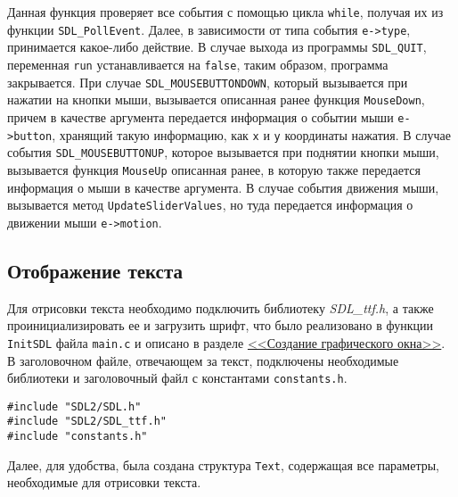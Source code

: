 \documentclass[14pt]{extarticle}
\begin{document}
{\begin{center}
\begin{tikzpicture}[transform shape, scale=0.7]
        \end{tikzpicture}
    \end{center}

    \begin{spacing}{1.5}
        Данная функция проверяет все события с помощью цикла \verb|while|, получая их из функции \verb|SDL_PollEvent|. Далее, в зависимости от типа события \verb|e->type|, принимается какое-либо действие. В случае выхода из программы \verb|SDL_QUIT|, переменная \verb|run| устанавливается на \verb|false|, таким образом, программа закрывается. При случае \verb|SDL_MOUSEBUTTONDOWN|, который вызывается при нажатии на кнопки мыши, вызывается описанная ранее функция \verb|MouseDown|, причем в качестве аргумента передается информация о событии мыши \verb|e->button|, хранящий такую информацию, как \verb|x| и \verb|y| координаты нажатия. В случае события \verb|SDL_MOUSEBUTTONUP|, которое вызывается при поднятии кнопки мыши, вызывается функция \verb|MouseUp| описанная ранее, в которую также передается информация о мыши в качестве аргумента. В случае события движения мыши, вызывается метод \verb|UpdateSliderValues|, но туда передается информация о движении мыши \verb|e->motion|.
    \end{spacing}
    \par

    {
        \par
        \subsection{Отображение текста}
        \label{sec:text}
        \par
    }

    \begin{spacing}{1.5}
        Для отрисовки текста необходимо подключить библиотеку \textit{SDL\_ttf.h}, а также проинициализировать ее и загрузить шрифт, что было реализовано в функции \verb|InitSDL| файла \verb|main.c| и описано в разделе \hyperref[sec:init]{<<Создание графического окна>>}. В заголовочном файле, отвечающем за текст, подключены необходимые библиотеки и заголовочный файл с константами \verb|constants.h|.
    \end{spacing}

    \begin{lstlisting}
#include "SDL2/SDL.h"
#include "SDL2/SDL_ttf.h"
#include "constants.h"\end{lstlisting}

    \begin{spacing}{1.5}
        Далее, для удобства, была создана структура \verb|Text|, содержащая все параметры, необходимые для отрисовки текста.
    \end{spacing}

}
\end{document}

